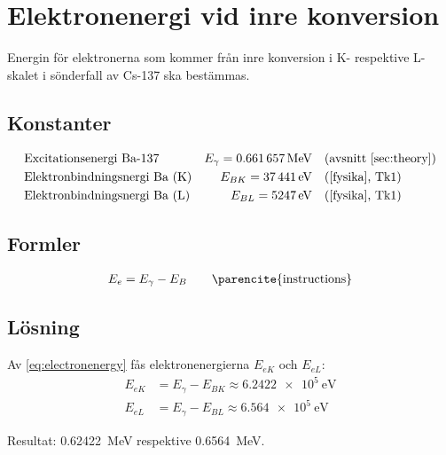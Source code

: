 \section{Elektronenergi vid inre konversion} \label{sec:conenergy}

Energin för elektronerna som kommer från inre konversion i K- respektive
L-skalet i sönderfall av Cs-137 ska bestämmas.

\subsection*{Konstanter}

\begin{align*}
    & \text{Excitationsenergi Ba-137}      & E_\gamma = \qty{0.661657}{\MeV} &\quad \text{(avsnitt~\ref{sec:theory})} \\
    & \text{Elektronbindningsnergi Ba (K)} & E_{BK}   = \qty{37441}{\eV}     &\quad \fysika{Tk1}                      \\
    & \text{Elektronbindningsnergi Ba (L)} & E_{BL}   = \qty{5247}{\eV}      &\quad \fysika{Tk1}
\end{align*}

\subsection*{Formler}

\begin{align}
    E_e &= E_\gamma - E_B &\quad \text{\parencite{instructions}} \label{eq:electronenergy}
\end{align}

\subsection*{Lösning}

Av \eqref{eq:electronenergy} fås elektronenergierna $E_{eK}$ och $E_{eL}$:
%
\begin{align}
    E_{eK} &= E_\gamma - E_{BK} \approx \qty{6.2422e5}{\eV} \\
    E_{eL} &= E_\gamma - E_{BL} \approx \qty{6.564e5}{\eV}
\end{align}

Resultat: \qty{0.62422}{\MeV} respektive \qty{0.6564}{\MeV}.
